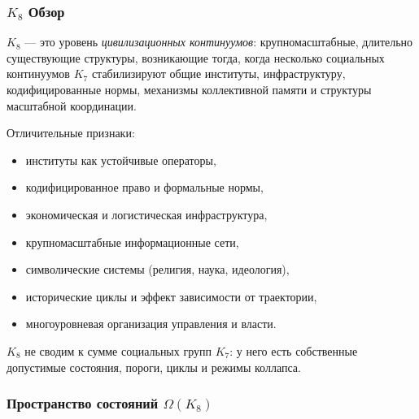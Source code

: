 

\subsubsection{\texorpdfstring{$K_8$}{K_8} Обзор}
\label{sec:k8-overview}

$K_8$ — это уровень \emph{цивилизационных континуумов}: крупномасштабные,
длительно существующие структуры, возникающие тогда, когда несколько социальных
континуумов $K_7$ стабилизируют общие институты, инфраструктуру, кодифицированные
нормы, механизмы коллективной памяти и структуры масштабной координации.

Отличительные признаки:
\begin{itemize}
    \item институты как устойчивые операторы,
    \item кодифицированное право и формальные нормы,
    \item экономическая и логистическая инфраструктура,
    \item крупномасштабные информационные сети,
    \item символические системы (религия, наука, идеология),
    \item исторические циклы и эффект зависимости от траектории,
    \item многоуровневая организация управления и власти.
\end{itemize}

$K_8$ не сводим к сумме социальных групп $K_7$: у него есть собственные
допустимые состояния, пороги, циклы и режимы коллапса.

\subsubsection{Пространство состояний \texorpdfstring{$\Omega(K_8)$}{$\Omega(K_8)$}}

